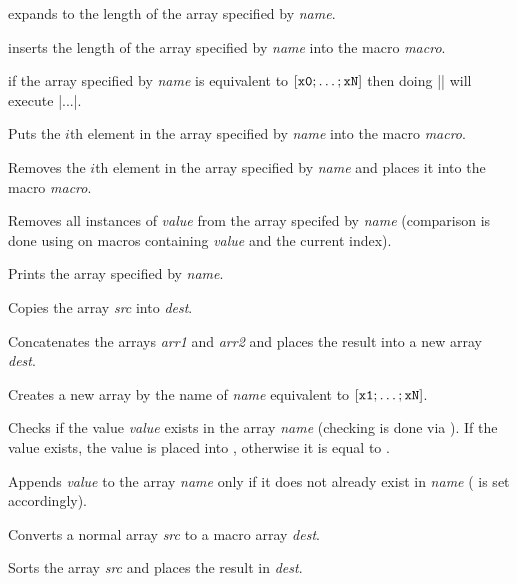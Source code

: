 expands to the length of the array specified by {\it name}.
\emacroexp

inserts the length of the array specified by {\it name} into the macro {\it macro}.
\emacroexp

if the array specified by {\it name} is equivalent to $\tt [x0;\dots;xN]$ then doing \inlinecode|\X| will execute \inlinecode|...|.
\emacroexp

Puts the $i$th element in the array specified by {\it name} into the macro {\it macro}.
\emacroexp

Removes the $i$th element in the array specified by {\it name} and places it into the macro {\it macro}.
\emacroexp

Removes all instances of {\it value} from the array specifed by {\it name} (comparison is done using \macro\ifx{} on macros containing {\it value} and the current index).
\emacroexp

Prints the array specified by {\it name}.
\emacroexp

Copies the array {\it src} into {\it dest}.
\emacroexp

Concatenates the arrays {\it arr1} and {\it arr2} and places the result into a new array {\it dest}.
\emacroexp

Creates a new array by the name of {\it name} equivalent to $\tt[x1;\dots;xN]$.
\emacroexp

Checks if the value {\it value} exists in the array {\it name} (checking is done via \macro\ifx).
If the value exists, the value \macro\True{} is placed into \macro\@return@value, otherwise it is equal to \macro\False.
\emacroexp

Appends {\it value} to the array {\it name} only if it does not already exist in {\it name} (\macro\@return@value{} is set accordingly).
\emacroexp

Converts a normal array {\it src} to a macro array {\it dest}.
\emacroexp

Sorts the array {\it src} and places the result in {\it dest}.
\emacroexp

